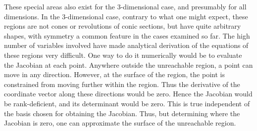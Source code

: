 \begin{multicols}{2}
These special areas also exist for the 3-dimensional case, and
presumably for all dimensions. In the 3-dimensional case, contrary 
to what one might expect, these regions are not cones or
revolutions of conic sections, but have quite arbitrary shapes, with 
symmetry a common feature in the cases examined so far.
The high number of variables involved have made analytical derivation 
of the equations of these regions very difficult. One way to do it 
numerically would be to evaluate the Jacobian at each point. Anywhere 
outside the unreachable region, a point can move in any direction. 
However, at the surface of the region, the point is constrained from 
moving further within the region. Thus the derivative of the 
coordinate vector along these directions would be zero. Hence the 
Jacobian would be rank-deficient, and its determinant would be zero.
This is true independent of the basis chosen for obtaining the Jacobian.
Thus, but determining where the Jacobian is zero, one can approximate 
the surface of the unreachable region.


\end{multicols}
